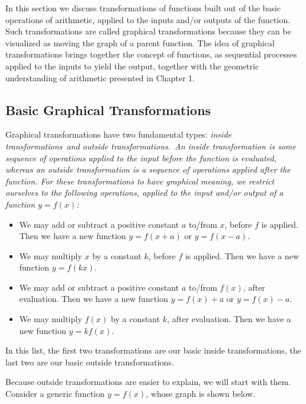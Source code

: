 In this section we discuss transformations of functions built out of the basic operations of arithmetic, applied to the inputs and/or outputs of the function. Such transformations are called graphical transformations because they can be visualized as moving the graph of a parent function. The idea of graphical transformations brings together the concept of functions, as sequential processes applied to the inputs to yield the output, together with the geometric understanding of arithmetic presented in Chapter 1.

\subsection{Basic Graphical Transformations}

Graphical transformations have two fundamental types: \it{inside transformations}\ \normalfont and \it{outside transformations}.\ \normalfont An inside transformation is some sequence of operations applied to the input before the function is evaluated, whereas an outside transformation is a sequence of operations applied after the function. For these transformations to have graphical meaning, we restrict ourselves to the following operations, applied to the input and/or output of a function $y=f(x)$:
\begin{itemize}
\item We may add or subtract a positive constant $a$ to/from $x$, before $f$ is applied. Then we have a new function $y = f(x+a)$ or $y=f(x-a)$.
\item We may multiply $x$ by a constant $k$, before $f$ is applied. Then we have a new function $y = f(kx)$.
\item We may add or subtract a positive constant $a$ to/from $f(x)$, after evaluation. Then we have a new function $y = f(x)+a$ or $y=f(x)-a$.
\item We may multiply $f(x)$ by a constant $k$, after evaluation. Then we have a new function $y = kf(x)$. 
\end{itemize}
In this list, the first two transformations are our basic inside transformations, the last two are our basic outside transformations.

\par 

Because outside transformations are easier to explain, we will start with them. Consider a generic function $y = f(x)$, whose graph is shown below.

